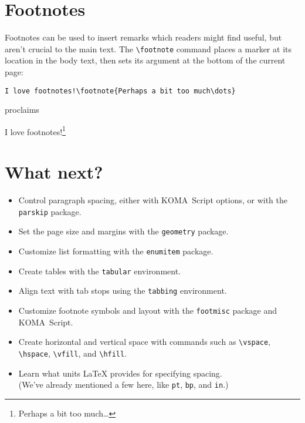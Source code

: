 \section{Footnotes}

Footnotes can be used to insert remarks which readers might
find useful, but aren't crucial to the main text.
The \verb|\footnote| command places a marker at its location in the
body text, then sets its argument at the bottom of the current
page:
\begin{leftfigure}
\begin{lstlisting}
I love footnotes!\footnote{Perhaps a bit too much\dots}
\end{lstlisting}
\end{leftfigure}
proclaims
\begin{leftfigure}
\lm%
I love footnotes!\footnote{Perhaps a bit too much\dots}
\end{leftfigure}

\section{What next?}
\begin{itemize}
\item Control paragraph spacing, either with
KOMA~Script options, or with the \texttt{parskip} package.
\item Set the page size and margins with the \texttt{geometry} package.
\item Customize list formatting with the \texttt{enumitem} package.
\item Create tables with the \texttt{tabular} environment.
\item Align text with tab stops using the \texttt{tabbing} environment.
\item Customize footnote symbols and layout with the
    \texttt{footmisc} package and KOMA~Script.
\item Create horizontal and vertical space with commands such as
    \verb|\vspace|, \verb|\hspace|, \verb|\vfill|, and \verb|\hfill|.
\item Learn what units \LaTeX{} provides for specifying spacing. \\
    (We've already mentioned a few here, like
    \texttt{pt}, \texttt{bp}, and \texttt{in}.)
\end{itemize}
